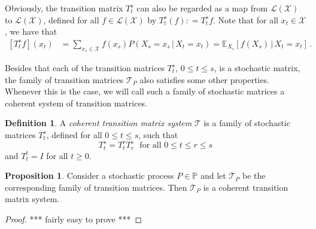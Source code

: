 \documentclass[10pt]{paper}
\theoremstyle{definition}
\newtheorem{proposition}[theorem]{Proposition}
\newtheorem{definition}{Definition}
\newcommand{\reals}{\mathbb{R}}
\newcommand{\realsnonneg}{\reals_{\geq 0}}
\newcommand{\states}{\mathcal{X}}
\newcommand{\processes}{\mathbb{P}}
\newcommand{\mprocesses}{\processes^{\mathrm{M}}}
\newcommand{\gambles}{\mathcal{L}}
\newcommand{\gamblesX}{\gambles(\states)}
\newcommand{\coloneqq}{:\!=}
\begin{document}
Obviously, the transition matrix $T_t^s$ can also be regarded as a map from $\gamblesX$ to $\gamblesX$, defined for all $f\in\gamblesX$ by $T_t^s(f)\coloneqq T_t^sf$. Note that for all $x_t\in\states$, we have that
\begin{align*}
\left[T_t^sf\right](x_t) &= \sum_{x_s\in\states}f(x_s)P(X_s=x_s\,\vert\,X_t=x_t)
= \mathbb{E}_{X_s}\left[f(X_s)\,\vert\,X_t=x_t\right]\,.
\end{align*}


Besides that each of the transition matrices $T_t^s$, $0\leq t\leq s$, is a stochastic matrix, the family of transition matrices $\mathcal{T}_P$ also satisfies some other properties. Whenever this is the case, we will call such a family of stochastic matrices a coherent system of transition matrices.

\begin{definition}
A \emph{coherent transition matrix system} $\mathcal{T}$ is a family of stochastic matrices $T_t^s$, defined for all $0\leq t\leq s$, such that
\begin{equation*}
T_t^s=T_t^r T_r^s
\text{~~for all $0\leq t\leq r\leq s$}
\end{equation*}
and $T_t^t=I$ for all $t\geq0$.
\end{definition}

\begin{proposition}
Consider a stochastic process $P\in\processes$ and let $\mathcal{T}_P$ be the corresponding family of transition matrices. Then $\mathcal{T}_P$ is a coherent transition matrix system.
\end{proposition}
\begin{proof}
*** fairly easy to prove ***
\end{proof}
\end{document}
